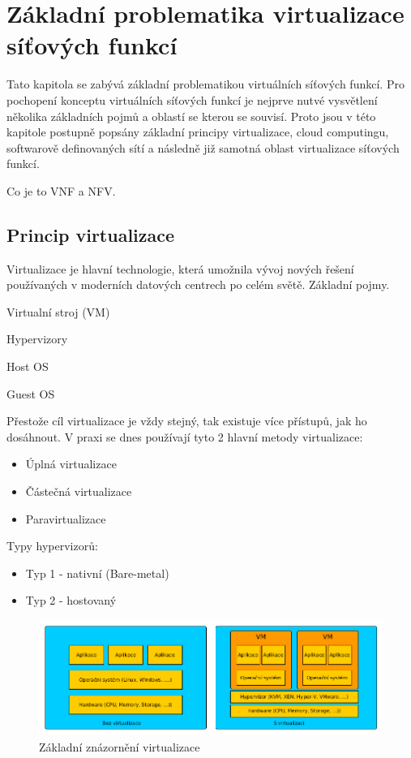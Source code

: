 \chapter{Základní problematika virtualizace síťových funkcí}

Tato kapitola se zabývá základní problematikou virtuálních síťových funkcí. Pro pochopení konceptu virtuálních síťových funkcí je nejprve nutvé vysvětlení několika základních pojmů a oblastí se kterou se souvisí. Proto jsou v této kapitole postupně popsány základní principy virtualizace, cloud computingu, softwarově definovaných sítí a následně již samotná oblast virtualizace síťových funkcí.


Co je to VNF a NFV. 


\section{Princip virtualizace}

Virtualizace je hlavní technologie, která umožnila vývoj nových řešení používaných v moderních datových centrech po celém světě. 
Základní pojmy. 

Virtualní stroj (VM)

Hypervizory

Host OS

Guest OS

Přestože cíl virtualizace je vždy stejný, tak existuje více přístupů, jak ho dosáhnout. V praxi se dnes používají tyto 2 hlavní metody virtualizace:

\begin{itemize}

\item Úplná virtualizace
\item Částečná virtualizace
\item Paravirtualizace

\end{itemize}

Typy hypervizorů:
\begin{itemize}
\item Typ 1 - nativní (Bare-metal)
\item Typ 2 - hostovaný
\end{itemize}


\begin{figure}[h]
\begin{centering}
\includegraphics[scale=0.5]{images/virtualization}
\par\end{centering}
\caption{Základní znázornění virtualizace\label{fig:virtualization}}
\end{figure}



